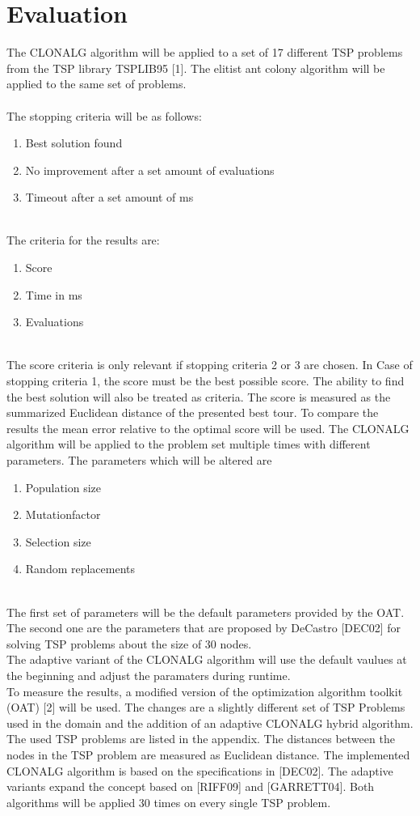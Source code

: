 \chapter{Evaluation}
\label{chap:eva}

The CLONALG algorithm will be applied to a set of 17 different TSP problems from the TSP library TSPLIB95 [1]. The elitist ant colony algorithm will be applied to the same set of problems.\\\\ 
The stopping criteria will be as follows:
\begin{enumerate}
	\item 	Best solution found
	\item 	No improvement after a set amount of evaluations
	\item 	Timeout after a set amount of ms
\end{enumerate}\\
The criteria for the results are:
\begin{enumerate}
	\item 	Score
	\item 	Time in ms
	\item 	Evaluations	
\end{enumerate}\\
The score criteria is only relevant if stopping criteria 2 or 3 are chosen. In Case of stopping criteria 1, the score must be the best possible score. The ability to find the best solution will also be treated as criteria. The score is measured as the summarized Euclidean distance of the presented best tour. To compare the results the mean error relative to the optimal score will be used. The CLONALG algorithm will be applied to the problem set multiple times with different parameters.
The parameters which will be altered are
\begin{enumerate}
	\item 	Population size
	\item 	Mutationfactor
	\item 	Selection size
	\item 	Random replacements	
\end{enumerate}\\
The first set of parameters will be the default parameters provided by the OAT. The second one are the parameters that are proposed by DeCastro [DEC02] for solving TSP problems about the size of 30 nodes.\\
The adaptive variant of the CLONALG algorithm will use the default vaulues at the beginning and adjust the paramaters during runtime.\\
To measure the results, a modified version of the optimization algorithm toolkit (OAT) [2] will be used. The changes are a slightly different set of TSP Problems used in the domain and the addition of an adaptive CLONALG hybrid algorithm. The used TSP problems are listed in the appendix. The distances between the nodes in the TSP problem are measured as Euclidean distance. The implemented CLONALG algorithm is based on the specifications in [DEC02]. The adaptive variants expand the concept based on [RIFF09] and [GARRETT04].
Both algorithms will be applied 30 times on every single TSP problem. 
